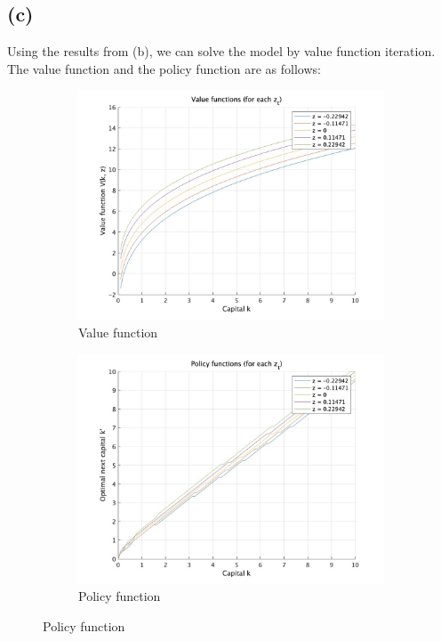 \documentclass{ltjsarticle}
\begin{document}
\subsection*{(c)}

Using the results from (b), we can solve the model by value function iteration. 
The value function and the policy function are as follows:

\begin{figure}[H]
    \centering
    \begin{subfigure}{0.45\textwidth}
        \centering
        \includegraphics[width=\textwidth]{ValueFunc.jpg}
        \caption{Value function}
    \end{subfigure}
    \begin{subfigure}{0.45\textwidth}
        \centering
        \includegraphics[width=\textwidth]{PolicyFunc.jpg}
        \caption{Policy function}
    \end{subfigure}
\end{figure}
\end{document}
